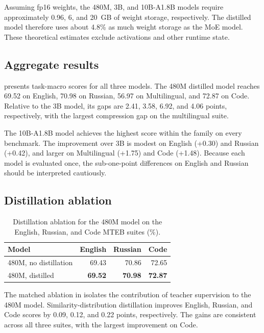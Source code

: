 \documentclass[11pt]{article}
\begin{document}
Assuming fp16 weights, the 480M, 3B, and 10B-A1.8B models require approximately 0.96, 6, and 20~GB of weight storage, respectively.
The distilled model therefore uses about 4.8\% as much weight storage as the MoE model.
These theoretical estimates exclude activations and other runtime state.

\subsection{Aggregate results}

 presents task-macro scores for all three models.
The 480M distilled model reaches 69.52 on English, 70.98 on Russian, 56.97 on Multilingual, and 72.87 on Code.
Relative to the 3B model, its gaps are 2.41, 3.58, 6.92, and 4.06 points, respectively, with the largest compression gap on the multilingual suite.

The 10B-A1.8B model achieves the highest score within the family on every benchmark.
The improvement over 3B is modest on English (+0.30) and Russian (+0.42), and larger on Multilingual (+1.75) and Code (+1.48).
Because each model is evaluated once, the sub-one-point differences on English and Russian should be interpreted cautiously.

\subsection{Distillation ablation}

\begin{table}[!t]
  \caption{Distillation ablation for the 480M model on the English, Russian, and Code MTEB suites (\%).}
  \label{tab:distillation-ablation}
  \centering
  \small
  \setlength{\tabcolsep}{3.5pt}
  \begin{tabular}{lrrr}
    \toprule
    \textbf{Model} & \textbf{English} & \textbf{Russian} & \textbf{Code} \\
    \midrule
    480M, no distillation & 69.43 & 70.86 & 72.65 \\
    480M, distilled       & \textbf{69.52} & \textbf{70.98} & \textbf{72.87} \\
    \bottomrule
  \end{tabular}
\end{table}

The matched ablation in  isolates the contribution of teacher supervision to the 480M model.
Similarity-distribution distillation improves English, Russian, and Code scores by 0.09, 0.12, and 0.22 points, respectively.
The gains are consistent across all three suites, with the largest improvement on Code.
\end{document}
